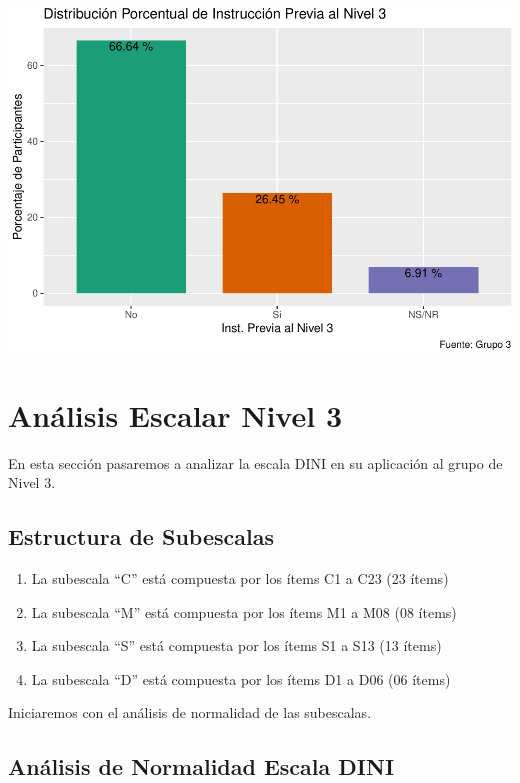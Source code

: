 \documentclass[
]{article}
\providecommand{\tightlist}{%
  \setlength{\itemsep}{0pt}\setlength{\parskip}{0pt}}
\begin{document}
\includegraphics{Info_Dinix_02_files/figure-latex/30_Insant3a-1.pdf}

\section{Análisis Escalar Nivel 3}\label{anuxe1lisis-escalar-nivel-3}

En esta sección pasaremos a analizar la escala DINI en su aplicación al
grupo de Nivel 3.

\subsection{Estructura de Subescalas}\label{estructura-de-subescalas}

\begin{enumerate}
\def\labelenumi{\arabic{enumi}.}
\tightlist
\item
  La subescala ``C'' está compuesta por los ítems C1 a C23 (23 ítems)
\item
  La subescala ``M'' está compuesta por los ítems M1 a M08 (08 ítems)
\item
  La subescala ``S'' está compuesta por los ítems S1 a S13 (13 ítems)
\item
  La subescala ``D'' está compuesta por los ítems D1 a D06 (06 ítems)
\end{enumerate}

Iniciaremos con el análisis de normalidad de las subescalas.

\subsection{Análisis de Normalidad Escala
DINI}\label{anuxe1lisis-de-normalidad-escala-dini}
\end{document}
